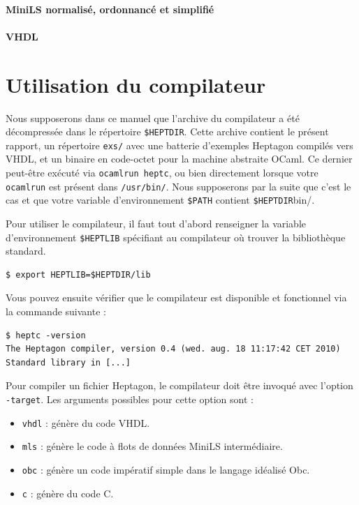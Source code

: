 \documentclass[9pt,a4paper]{article}
\newcommand{\LANG}{Heptagon}
\begin{document}
\paragraph{MiniLS normalisé, ordonnancé et simplifié}

\small

\normalsize

\paragraph{VHDL}

\small

\normalsize

\section{Utilisation du compilateur}

Nous supposerons dans ce manuel que l'archive du compilateur a été décompressée
dans le répertoire \verb/$HEPTDIR/. Cette archive contient le présent rapport,
un répertoire \texttt{exs/} avec une batterie d'exemples \LANG{} compilés vers
VHDL, et un binaire en code-octet pour la machine abstraite OCaml. Ce dernier
peut-être exécuté via \texttt{ocamlrun heptc}, ou bien directement lorsque votre
\texttt{ocamlrun} est présent dans \texttt{/usr/bin/}. Nous supposerons par la
suite que c'est le cas et que votre variable d'environnement \verb/$PATH/
contient \verb/$HEPTDIR/bin/.

Pour utiliser le compilateur, il faut tout d'abord renseigner la variable
d'environnement \verb/$HEPTLIB/ spécifiant au compilateur où trouver la
bibliothèque standard.

\begin{verbatim}
$ export HEPTLIB=$HEPTDIR/lib
\end{verbatim}

Vous pouvez ensuite vérifier que le compilateur est disponible et fonctionnel
via la commande suivante :

\begin{verbatim}
$ heptc -version
The Heptagon compiler, version 0.4 (wed. aug. 18 11:17:42 CET 2010)
Standard library in [...]
\end{verbatim}

Pour compiler un fichier \LANG{}, le compilateur doit être invoqué avec l'option
\verb/-target/. Les arguments possibles pour cette option sont :

\begin{itemize}
\item \verb/vhdl/ : génère du code VHDL.
\item \verb/mls/ : génère le code à flots de données MiniLS intermédiaire.
\item \verb/obc/ : génère un code impératif simple dans le langage idéalisé Obc.
\item \verb/c/ : génère du code C.
\end{itemize}
\end{document}
